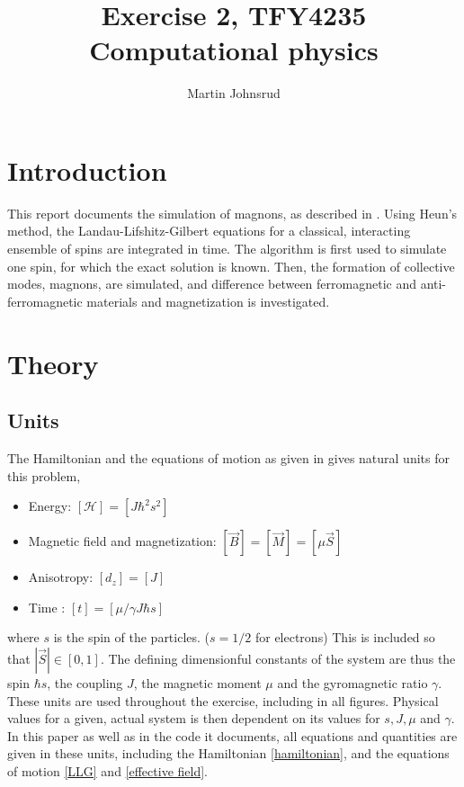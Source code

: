 \documentclass{article}
\title{Exercise 2, TFY4235 Computational physics}
\author{Martin Johnsrud}
\date{}
\begin{document}
    \maketitle
    \section*{Introduction}
    This report documents the simulation of magnons, as described in \cite{exercise}.
    Using Heun's method, the Landau-Lifshitz-Gilbert equations for a classical, interacting ensemble of spins are integrated in time.
    The algorithm is first used to simulate one spin, for which the exact solution is known.
    Then, the formation of collective modes, magnons, are simulated, and difference between ferromagnetic and anti-ferromagnetic materials and magnetization is investigated.

    \section*{Theory}
    \subsection*{Units}

    The Hamiltonian and the equations of motion as given in \cite{exercise} gives natural units for this problem,
    \begin{itemize}
        \item Energy: $[\mathcal H] = [J \hbar^2 s^2]$
        \item Magnetic field and magnetization: $[\vec B] = [\vec M] = [\mu \vec S ]$
        \item Anisotropy: $[d_z] = [J]$
        \item Time : $[t] = [\mu/\gamma J \hbar s]$
    \end{itemize}
     where $s$ is the spin of the particles.
     ($s=1/2$ for electrons)
     This is included so that $|\vec S|\in[0, 1]$.
     The defining dimensionful constants of the system are thus the spin $\hbar s$, the coupling $J$, the magnetic moment $\mu$ and the gyromagnetic ratio $\gamma$.
     These units are used throughout the exercise, including in all figures.
     Physical values for a given, actual system is then dependent on its values for $s, J, \mu$ and $\gamma$.
     In this paper as well as in the code it documents, all equations and quantities are given in these units, including the Hamiltonian \autoref{hamiltonian}, and the equations of motion \autoref{LLG} and \autoref{effective field}.
\end{document}

